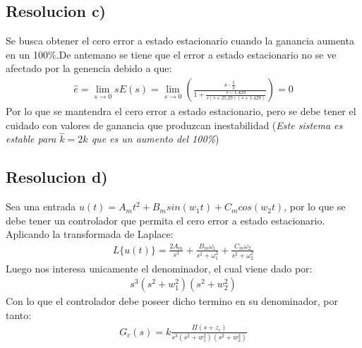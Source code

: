\documentclass[
  11pt,
  letterpaper,
   addpoints,
   answers
  ]{exam}
\begin{document}
\begin{questions}
\begin{solution}
\subsection*{Resolucion c)}
Se busca obtener el cero error a estado estacionario cuando la ganancia aumenta en un 100\%.De antemano se tiene que el error a estado estacionario no se ve afectado por la genencia debido a que:
\begin{align}
    \hat{e}= \lim_{s \to 0} sE(s) = \lim_{s \to 0} \left(\frac{s \cdot \frac{1}{s}}{1+ \frac{s-1.429}{s(s+25.29)(s+1.429)}}\right) = 0
\end{align}
Por lo que se mantendra el cero error a estado estacionario, pero se debe tener el cuidado con valores de ganancia que produzcan inestabilidad (\textit{Este sistema es estable para $\hat{k} = 2k$ que es un aumento del 100\%})
\subsection*{Resolucion d)}
Sea una entrada $u(t)= A_m t^{2} + B_m sin(w_{1}t) + C_m cos(w_{2}t)$, por lo que se debe tener un controlador que permita el cero error a estado estacionario. Aplicando la transformada de Laplace:
\begin{align}
    L\{u(t)\} = \frac{2A_m}{s^{3}} + \frac{B_m \omega_{1}}{s^{2} + \omega_{1}^{2}} + \frac{C_m \omega_{2}}{s^{2} + \omega_{2}^{2}}
\end{align}
Luego nos interesa unicamente el denominador, el cual viene dado por:
\begin{align}
    s^{3}(s^{2}+w_{1}^{2})(s^{2} + w_{2}^{2})
\end{align}
Con lo que el controlador debe poseer dicho termino en su denominador, por tanto:
\begin{align}
    G_{c}(s) = k \frac{\Pi (s+ z_{i}) }{ s^{3}(s^{2}+w_{1}^{2})(s^{2} + w_{2}^{2})}
\end{align}


\end{solution}
\end{questions}
\end{document}
